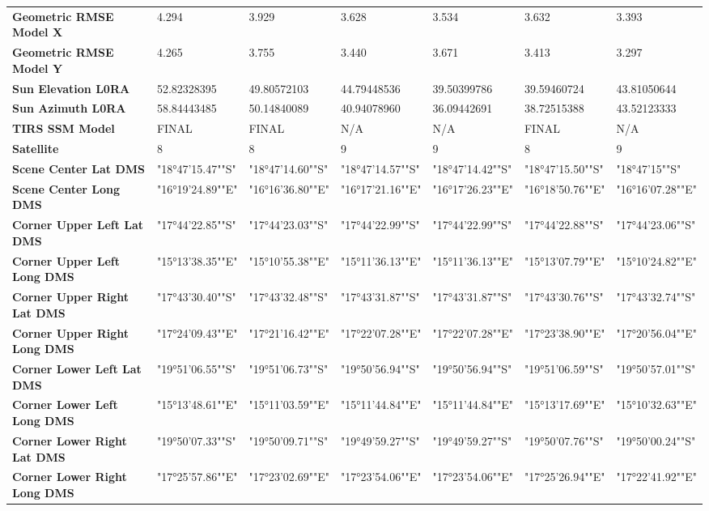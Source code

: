 \documentclass[climate,article,submit,pdftex,moreauthors]{Definitions/mdpi}
\begin{document}
\begin{landscape}
\begin{table}
\begin{tabular}{|l|l|l|l|l|l|l|}
        \textbf{Geometric RMSE Model X} & 4.294 & 3.929 & 3.628 & 3.534 & 3.632 & 3.393 \\
        \textbf{Geometric RMSE Model Y} & 4.265 & 3.755 & 3.440 & 3.671 & 3.413 & 3.297 \\
        \textbf{Sun Elevation L0RA} & 52.82328395 & 49.80572103 & 44.79448536 & 39.50399786 & 39.59460724 & 43.81050644 \\
        \textbf{Sun Azimuth L0RA} & 58.84443485 & 50.14840089 & 40.94078960 & 36.09442691 & 38.72515388 & 43.52123333 \\
        \textbf{TIRS SSM Model} & FINAL & FINAL & N/A & N/A & FINAL & N/A \\
        \textbf{Satellite} & 8 & 8 & 9 & 9 & 8 & 9 \\
        \textbf{Scene Center Lat DMS} & "18°47'15.47""S" & "18°47'14.60""S" & "18°47'14.57""S" & "18°47'14.42""S" & "18°47'15.50""S" & "18°47'15""S" \\
        \textbf{Scene Center Long DMS} & "16°19'24.89""E" & "16°16'36.80""E" & "16°17'21.16""E" & "16°17'26.23""E" & "16°18'50.76""E" & "16°16'07.28""E" \\
        \textbf{Corner Upper Left Lat DMS} & "17°44'22.85""S" & "17°44'23.03""S" & "17°44'22.99""S" & "17°44'22.99""S" & "17°44'22.88""S" & "17°44'23.06""S" \\
        \textbf{Corner Upper Left Long DMS} & "15°13'38.35""E" & "15°10'55.38""E" & "15°11'36.13""E" & "15°11'36.13""E" & "15°13'07.79""E" & "15°10'24.82""E" \\
        \textbf{Corner Upper Right Lat DMS} & "17°43'30.40""S" & "17°43'32.48""S" & "17°43'31.87""S" & "17°43'31.87""S" & "17°43'30.76""S" & "17°43'32.74""S" \\
        \textbf{Corner Upper Right Long DMS} & "17°24'09.43""E" & "17°21'16.42""E" & "17°22'07.28""E" & "17°22'07.28""E" & "17°23'38.90""E" & "17°20'56.04""E" \\
        \textbf{Corner Lower Left Lat DMS} & "19°51'06.55""S" & "19°51'06.73""S" & "19°50'56.94""S" & "19°50'56.94""S" & "19°51'06.59""S" & "19°50'57.01""S" \\
        \textbf{Corner Lower Left Long DMS} & "15°13'48.61""E" & "15°11'03.59""E" & "15°11'44.84""E" & "15°11'44.84""E" & "15°13'17.69""E" & "15°10'32.63""E" \\
        \textbf{Corner Lower Right Lat DMS} & "19°50'07.33""S" & "19°50'09.71""S" & "19°49'59.27""S" & "19°49'59.27""S" & "19°50'07.76""S" & "19°50'00.24""S" \\
        \textbf{Corner Lower Right Long DMS} & "17°25'57.86""E" & "17°23'02.69""E" & "17°23'54.06""E" & "17°23'54.06""E" & "17°25'26.94""E" & "17°22'41.92""E" \\

\end{tabular}
\end{table}
\end{landscape}
\end{document}
